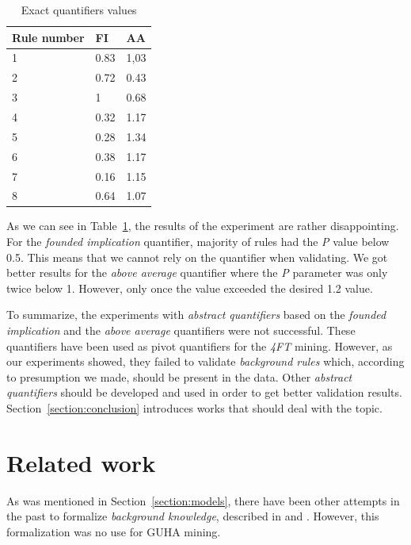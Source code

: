 \documentclass{llncs}
\begin{document}
\begin{table}[ht]
	\centering
	\begin{tabular}{|p{}|p{}|p{}|}
		\hline
		\textbf{Rule number}&\textbf{FI}&\textbf{AA}\\
		\hline
		1&0.83&1,03\\
		\hline
		2&0.72&0.43\\
		\hline
		3&1&0.68\\
		\hline
		4&0.32&1.17\\
		\hline
		5&0.28&1.34\\
		\hline
		6&0.38&1.17\\
		\hline
		7&0.16&1.15\\
		\hline
		8&0.64&1.07\\
		\hline
	\end{tabular}
\caption{Exact quantifiers values}
\label{tab:validation2}
\end{table}

As we can see in Table~\ref{tab:validation2}, the results of the experiment
are rather disappointing. For the \emph{founded implication} quantifier, majority
of rules had the \emph{P} value below 0.5. This means that we cannot rely on
the quantifier when validating. We got better results for the \emph{above average}
quantifier where the \emph{P} parameter was only twice below 1. However, only once
the value exceeded the desired 1.2 value. 

To summarize, the experiments with \emph{abstract quantifiers} based on the 
\emph{founded implication} and the \emph{above average} quantifiers were not 
successful. These quantifiers have been used as pivot quantifiers for the \emph{4FT}
mining. However, as our experiments showed, they failed to validate \emph{background
rules} which, according to presumption we made, should be present in the data. 
Other \emph{abstract quantifiers} should be developed and used in order to get better
validation results. Section~\ref{section:conclusion} introduces works that
should deal with the topic.

\section{Related work}
\label{section:related}

As was mentioned in Section~\ref{section:models}, there have been other attempts
in the past to formalize \emph{background knowledge}, described in \cite{Qualitative1}
and \cite{Qualitative2}. However, this formalization was no use for GUHA mining. 
\end{document}
